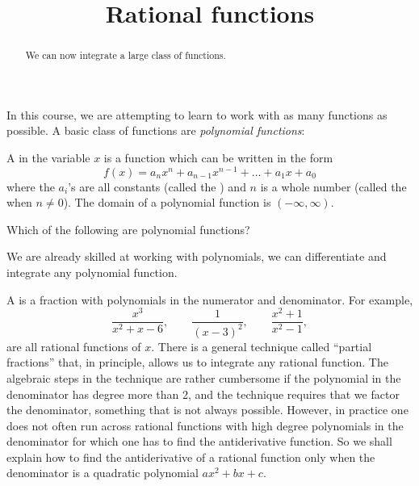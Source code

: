 \documentclass{ximera}
\title[Dig-In:]{Rational functions}
\begin{document}
\begin{abstract}
We can now integrate a large class of functions.  
\end{abstract}
\maketitle

In this course, we are attempting to learn to work with as many
functions as possible. A basic class of functions are \textit{polynomial functions}:

\begin{definition}
  A  in the variable $x$ is a function
  which can be written in the form
  \[
  f(x) = a_nx^n + a_{n-1}x^{n-1} + \dots + a_1 x + a_0
  \]
  where the $a_i$'s are all constants (called the )
  and $n$ is a whole number (called the  when $n\ne
  0$). The domain of a polynomial function is $(-\infty,\infty)$.
\end{definition}

\begin{question}
  Which of the following are polynomial functions?
  \begin{selectAll}
  \end{selectAll}
\end{question}

We are already skilled at working with polynomials, we can
differentiate and integrate any polynomial function.

A  is a fraction with polynomials in the
numerator and denominator.  For example,
\[
  \frac{x^3}{x^2+x-6},
  \qquad
  \frac{1}{(x-3)^2},
  \qquad
  \frac{x^2+1}{x^2-1},
\] 
are all rational functions of $x$.  There is a general technique
called ``partial fractions'' that, in
principle, allows us to integrate any rational function.  The
algebraic steps in the technique are rather cumbersome if the
polynomial in the denominator has degree more than 2, and the
technique requires that we factor the denominator, something that is
not always possible.  However, in practice one does not often run
across rational functions with high degree polynomials in the
denominator for which one has to find the antiderivative function.  So
we shall explain how to find the antiderivative of a rational function
only when the denominator is a quadratic polynomial $ax^2+bx+c$.
\end{document}
